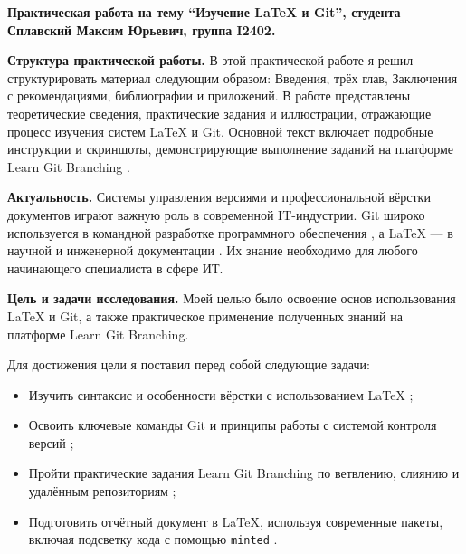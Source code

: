 \documentclass[a4paper,12pt]{report}
\newcommand{\uniGroupName}{I2402}
\newcommand{\authorNameRu}{Сплавский Максим Юрьевич}
\newcommand{\thesisTitleRu}{Изучение \LaTeX{} и Git}
\begin{document}


\clearpage
\tableofcontents %


\clearpage
{}

\textbf{Практическая работа на тему ``\thesisTitleRu{}'', студента \authorNameRu{}, группа \uniGroupName{}.}

\textbf{Структура практической работы.}
В этой практической работе я решил структурировать материал следующим образом: Введения, трёх глав, Заключения с рекомендациями, библиографии и приложений. В работе представлены теоретические сведения, практические задания и иллюстрации, отражающие процесс изучения систем \LaTeX{} и Git. Основной текст включает подробные инструкции и скриншоты, демонстрирующие выполнение заданий на платформе Learn Git Branching \cite{learngitbranching}.

\textbf{Актуальность.}
Системы управления версиями и профессиональной вёрстки документов играют важную роль в современной IT-индустрии. Git широко используется в командной разработке программного обеспечения \cite{git_official_doc, progit_book}, а \LaTeX{} — в научной и инженерной документации \cite{latex_official_doc, latex_project_site, overleaf_intro}. Их знание необходимо для любого начинающего специалиста в сфере ИТ.

\textbf{Цель и задачи исследования.}
Моей целью было освоение основ использования \LaTeX{} и Git, а также практическое применение полученных знаний на платформе Learn Git Branching.

Для достижения цели я поставил перед собой следующие задачи:
\begin{itemize}
  \item Изучить синтаксис и особенности вёрстки с использованием \LaTeX{} \cite{latex_official_doc, latex_project_site};
  \item Освоить ключевые команды Git и принципы работы с системой контроля версий \cite{progit_book};
  \item Пройти практические задания Learn Git Branching по ветвлению, слиянию и удалённым репозиториям \cite{learngitbranching};
  \item Подготовить отчётный документ в \LaTeX{}, используя современные пакеты, включая подсветку кода с помощью \texttt{minted} \cite{latex_minted}.
\end{itemize}
\end{document}
